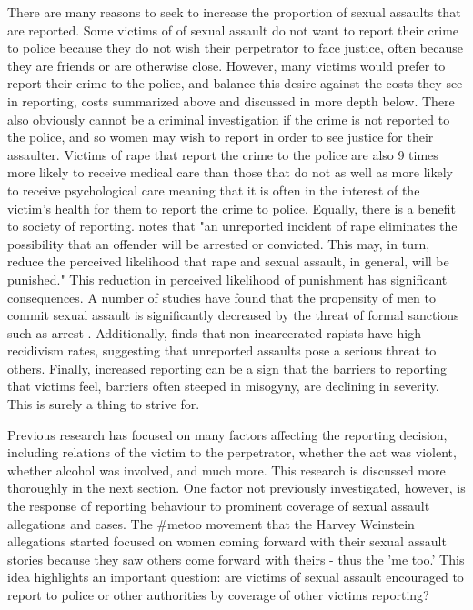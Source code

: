 \documentclass[AER,draftmode]{AEA}
\begin{document}
There are many reasons to seek to increase the proportion of sexual assaults that are reported. Some victims of of sexual assault do not want to report their crime to police because they do not wish their perpetrator to face justice, often because they are friends or are otherwise close. However, many victims would prefer to report their crime to the police, and balance this desire against the costs they see in reporting, costs summarized above and discussed in more depth below. There also obviously cannot be a criminal investigation if the crime is not reported to the police, and so women may wish to report in order to see justice for their assaulter. Victims of rape that report the crime to the police are also 9 times more likely to receive medical care than those that do not \cite{resnick_predictors_2000} as well as more likely to receive psychological care \cite{sable_barriers_2006} meaning that it is often in the interest of the victim's health for them to report the crime to police. Equally, there is a benefit to society of reporting.  notes that "an unreported incident of rape eliminates the possibility that an offender will be arrested or convicted. This may, in turn, reduce the perceived likelihood that rape and sexual assault, in general, will be punished." This reduction in perceived likelihood of punishment has significant consequences. A number of studies have found that the propensity of men to commit sexual assault is significantly decreased by the threat of formal sanctions such as arrest \cite{bachman_rationality_1992, antunes_impact_1974}. Additionally,  finds that non-incarcerated rapists have high recidivism rates, suggesting that unreported assaults pose a serious threat to others. Finally, increased reporting can be a sign that the barriers to reporting that victims feel, barriers often steeped in misogyny, are declining in severity. This is surely a thing to strive for.

Previous research has focused on many factors affecting the reporting decision, including relations of the victim to the perpetrator, whether the act was violent, whether alcohol was involved, and much more. This research is discussed more thoroughly in the next section. One factor not previously investigated, however, is the response of reporting behaviour to prominent coverage of sexual assault allegations and cases. The \#metoo movement that the Harvey Weinstein allegations started focused on women coming forward with their sexual assault stories because they saw others come forward with theirs - thus the 'me too.' This idea highlights an important question: are victims of sexual assault encouraged to report to police or other authorities by coverage of other victims reporting?
\end{document}
